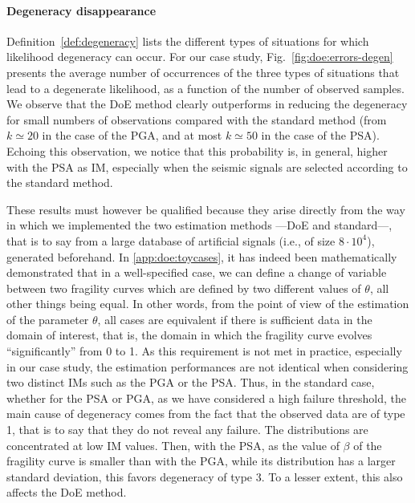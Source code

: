 \paragraph{Degeneracy disappearance} 

{Definition~\ref{def:degeneracy} lists the different types of situations for which likelihood degeneracy can occur. For our case study, Fig.~\ref{fig:doe:errors-degen} presents the average number of occurrences of the three types of situations that lead to a degenerate likelihood, as a function of the number of observed samples. We observe that the DoE method clearly outperforms in reducing the degeneracy for small numbers of observations compared with the standard method (from $k\simeq 20$ in the case of the PGA, and at most $k\simeq 50$ in the case of the PSA). Echoing this observation, we notice that this probability is, in general, higher with the PSA as IM, especially when the seismic signals are selected according to the standard method.

These results must however be qualified because they arise directly from the way in which we implemented the two estimation methods ---DoE and standard---, that is to say from a large database of artificial signals (i.e., of size $8\cdot10^4$), generated {beforehand}. In \ref{app:doe:toycases}, it has indeed been mathematically demonstrated that in a well-specified case, we can define a change of variable between two fragility curves which are defined by two different values of $\theta$, all other things being equal. In other words, from the point of view of the estimation of the parameter $\theta$, all cases are equivalent if there is sufficient data in the domain of interest, that is, the domain in which the fragility curve evolves “significantly” from 0 to 1. As this requirement is not met in practice, especially in our case study, the estimation performances are not identical when considering two distinct IMs such as the PGA or the PSA. Thus, in the standard case, whether for the PSA or PGA, as we have considered a high failure threshold, the main cause of degeneracy comes from the fact that the observed data are of type 1, that is to say that they do not reveal any failure. The distributions are concentrated at low IM values. Then, with the PSA, as the value of $\beta$ of the fragility curve is smaller than with the PGA, while its distribution has a larger standard deviation, this favors degeneracy of type 3. To a lesser extent, this also affects the DoE method.}

